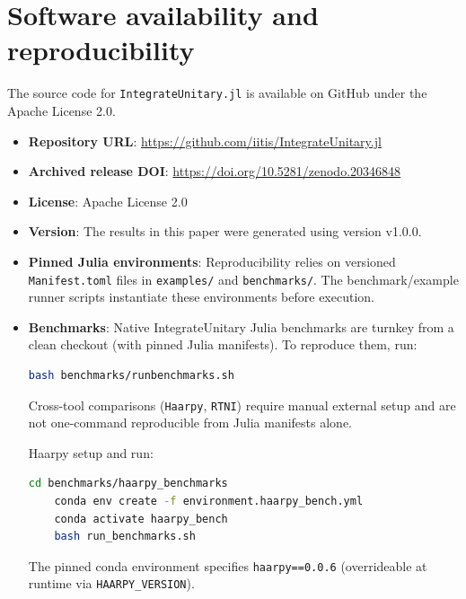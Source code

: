 \documentclass[manuscript,screen]{acmart}
\begin{document}
\section{Software availability and reproducibility}
\label{sec:availability}
The source code for \texttt{IntegrateUnitary.jl} is available on GitHub under the Apache License 2.0.
\begin{itemize}
    \item \textbf{Repository URL}: \url{https://github.com/iitis/IntegrateUnitary.jl}
    \item \textbf{Archived release DOI}: \url{https://doi.org/10.5281/zenodo.20346848}
    \item \textbf{License}: Apache License 2.0
    \item \textbf{Version}: The results in this paper were generated using
    version v1.0.0.
    \item \textbf{Pinned Julia environments}: Reproducibility relies on
    versioned \texttt{Manifest.toml} files in \texttt{examples/} and
    \texttt{benchmarks/}. The benchmark/example runner scripts instantiate
    these environments before execution.
    \item \textbf{Benchmarks}: Native IntegrateUnitary Julia benchmarks are turnkey from a
    clean checkout (with pinned Julia manifests). To reproduce them, run:
    \begin{lstlisting}[language=bash]
    bash benchmarks/runbenchmarks.sh
    \end{lstlisting}
    Cross-tool comparisons (\texttt{Haarpy}, \texttt{RTNI}) require manual
    external setup and are not one-command reproducible from Julia manifests
    alone.

    Haarpy setup and run:
    \begin{lstlisting}[language=bash]
    cd benchmarks/haarpy_benchmarks
    conda env create -f environment.haarpy_bench.yml
    conda activate haarpy_bench
    bash run_benchmarks.sh
    \end{lstlisting}
    The pinned conda environment specifies \texttt{haarpy==0.0.6}
    (overrideable at runtime via \texttt{HAARPY\_VERSION}).


\end{itemize}
\end{document}
